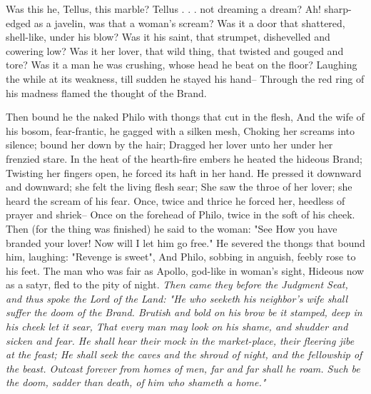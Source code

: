 \begin{poemblock}
 Was this he, Tellus, this marble?  Tellus . . . not dreaming a dream?
 Ah! sharp-edged as a javelin, was that a woman's scream?
 Was it a door that shattered, shell-like, under his blow?
 Was it his saint, that strumpet, dishevelled and cowering low?
 Was it her lover, that wild thing, that twisted and gouged and tore?
 Was it a man he was crushing, whose head he beat on the floor?
 Laughing the while at its weakness, till sudden he stayed his hand--
 Through the red ring of his madness flamed the thought of the Brand.

 Then bound he the naked Philo with thongs that cut in the flesh,
 And the wife of his bosom, fear-frantic, he gagged with a silken mesh,
 Choking her screams into silence; bound her down by the hair;
 Dragged her lover unto her under her frenzied stare.
 In the heat of the hearth-fire embers he heated the hideous Brand;
 Twisting her fingers open, he forced its haft in her hand.
 He pressed it downward and downward; she felt the living flesh sear;
 She saw the throe of her lover; she heard the scream of his fear.
 Once, twice and thrice he forced her, heedless of prayer and shriek--
 Once on the forehead of Philo, twice in the soft of his cheek.
 Then (for the thing was finished) he said to the woman:  "See
 How you have branded your lover!  Now will I let him go free."
 He severed the thongs that bound him, laughing:  "Revenge is sweet",
 And Philo, sobbing in anguish, feebly rose to his feet.
 The man who was fair as Apollo, god-like in woman's sight,
 Hideous now as a satyr, fled to the pity of night.
\textit{
  Then came they before the Judgment Seat,
and thus spoke the Lord of the Land:
  "He who seeketh his neighbor's wife
shall suffer the doom of the Brand.
  Brutish and bold on his brow be it stamped,
deep in his cheek let it sear,
  That every man may look on his shame, and shudder and sicken and fear.
  He shall hear their mock in the market-place,
their fleering jibe at the feast;
  He shall seek the caves and the shroud of night,
and the fellowship of the beast.
  Outcast forever from homes of men, far and far shall he roam.
  Such be the doom, sadder than death, of him who shameth a home."
}
\end{poemblock}
